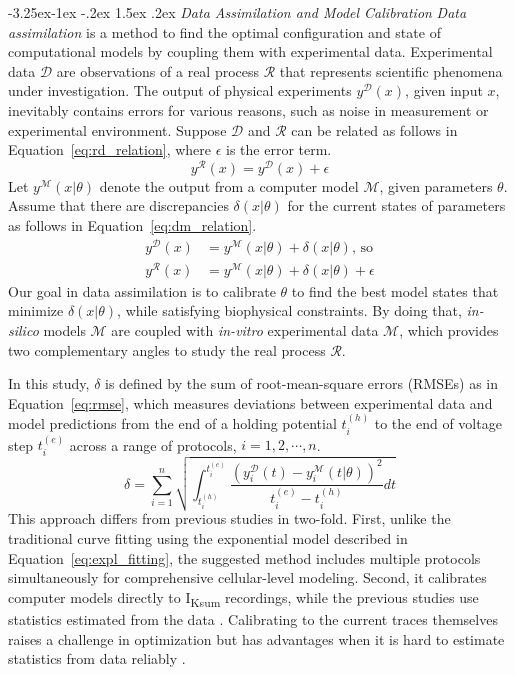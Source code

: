 \documentclass[11pt]{article}
\makeatletter
\renewcommand\subsection{\@startsection{subsection}{2}{\z@}%
                                     {-3.25ex\@plus -1ex \@minus -.2ex}%
                                     {1.5ex \@plus .2ex}%
                                     {\normalfont\fontfamily{phv}\fontsize{14}{17}\bfseries}}
\makeatother
\begin{document}
\subsection{\emph{Data Assimilation and Model Calibration}} \label{s:methods.2}
\textit{Data assimilation} is a method to find the optimal configuration and state of computational models by coupling them with experimental data. Experimental data $\mathcal{D}$ are observations of a real process $\mathcal{R}$ that represents scientific phenomena under investigation. The output of physical experiments $y^{\mathcal{D}}(x)$, given input $x$, inevitably contains errors for various reasons, such as noise in measurement or experimental environment. Suppose $\mathcal{D}$ and $\mathcal{R}$ can be related as follows in Equation~\ref{eq:rd_relation}, where $\epsilon$ is the error term. 
\begin{equation}
    \label{eq:rd_relation}
    y^{\mathcal{R}}(x) = y^{\mathcal{D}}(x) + \epsilon
\end{equation}
Let $y^{\mathcal{M}}(x|\theta)$ denote the output from a computer model $\mathcal{M}$, given parameters $\theta$. Assume that there are discrepancies $\delta(x|\theta)$ for the current states of parameters as follows in Equation~\ref{eq:dm_relation}. 
\begin{align}
    \label{eq:dm_relation}
    y^{\mathcal{D}}(x) &= y^{\mathcal{M}}(x|\theta) + \delta(x|\theta) \text{, so} \\
    y^{\mathcal{R}}(x) &= y^{\mathcal{M}}(x|\theta) + \delta(x|\theta) + \epsilon
\end{align}
Our goal in data assimilation is to calibrate $\theta$ to find the best model states that minimize $\delta(x|\theta)$, while satisfying biophysical constraints. By doing that, \textit{in-silico} models $\mathcal{M}$ are coupled with \textit{in-vitro} experimental data $\mathcal{M}$, which provides two complementary angles to study the real process $\mathcal{R}$.

In this study, $\delta$ is defined by the sum of root-mean-square errors (RMSEs) as in Equation~\ref{eq:rmse}, which measures deviations between experimental data and model predictions from the end of a holding potential $t_i^{(h)}$ to the end of voltage step $t_i^{(e)}$ across a range of protocols, $i=1,2,\cdots,n$.
\begin{equation}
    \label{eq:rmse}
    \delta = \sum_{i=1}^{n} \sqrt{\int_{t_i^{(h)}}^{t_i^{(e)}}\frac{(y_i^{\mathcal{D}}(t) - y_i^{\mathcal{M}}(t|\theta))^2}{t_i^{(e)}-t_i^{(h)}}dt}
\end{equation}
This approach differs from previous studies in two-fold. First, unlike the traditional curve fitting using the exponential model described in Equation~\ref{eq:expl_fitting}, the suggested method includes multiple protocols simultaneously for comprehensive cellular-level modeling. Second, it calibrates computer models directly to I\textsubscript{Ksum} recordings, while the previous studies use statistics estimated from the data \citep{du2015statistical, du2017silico, kim2022simulation}. Calibrating to the current traces themselves raises a challenge in optimization but has advantages when it is hard to estimate statistics from data reliably \citep{kim2022simulation}.
\end{document}
